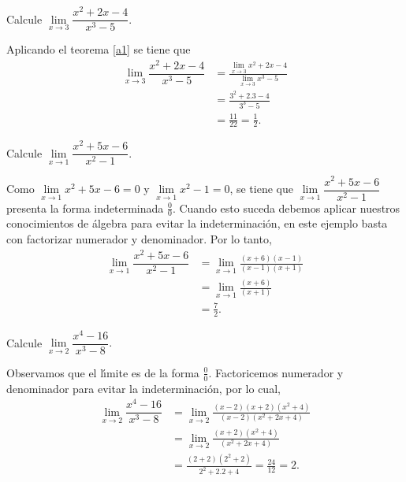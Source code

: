 \begin{example}
Calcule $\lim\limits_{x\rightarrow3}\dfrac{x^{2}+2x-4}{x^{3}-5}.$
\end{example}

\begin{sol}
Aplicando el teorema \ref{a1} se tiene que
\begin{align*}
\lim\limits_{x\rightarrow3}\dfrac{x^{2}+2x-4}{x^{3}-5}  &  =\frac
{\lim\limits_{x\rightarrow3}x^{2}+2x-4}{\lim\limits_{x\rightarrow3}x^{3}-5}\\
&  =\frac{3^{2}+2.3-4}{3^{3}-5}\\
&  =\frac{11}{22}=\frac{1}{2}.
\end{align*}

\end{sol}

\begin{example}
Calcule $\lim\limits_{x\rightarrow1}\dfrac{x^{2}+5x-6}{x^{2}-1}.$
\end{example}

\begin{sol}
Como $\lim\limits_{x\rightarrow1}x^{2}+5x-6=0$ y $\lim\limits_{x\rightarrow
1}x^{2}-1=0$, se tiene que $\lim\limits_{x\rightarrow1}\dfrac{x^{2}%
+5x-6}{x^{2}-1}$ presenta la forma indeterminada $\frac{0}{0}$. Cuando esto
suceda debemos aplicar nuestros conocimientos de \'{a}lgebra para evitar la
indeterminaci\'{o}n, en este ejemplo basta con factorizar numerador y
denominador. Por lo tanto,
\begin{align*}
\lim\limits_{x\rightarrow1}\dfrac{x^{2}+5x-6}{x^{2}-1}  &  =\lim
\limits_{x\rightarrow1}\frac{\left(  x+6\right)  \left(  x-1\right)  }{\left(
x-1\right)  \left(  x+1\right)  }\\
&  =\lim\limits_{x\rightarrow1}\frac{\left(  x+6\right)  }{\left(  x+1\right)
}\\
&  =\frac{7}{2}.
\end{align*}

\end{sol}

\begin{example}
Calcule $\lim\limits_{x\rightarrow2}\dfrac{x^{4}-16}{x^{3}-8}.$
\end{example}

\begin{sol}
Observamos que el l\'{\i}mite es de la forma $\frac{0}{0}.$ Factoricemos
numerador y denominador para evitar la indeterminaci\'{o}n, por lo cual,%
\begin{align*}
\lim\limits_{x\rightarrow2}\dfrac{x^{4}-16}{x^{3}-8}  &  =\lim
\limits_{x\rightarrow2}\frac{(x-2)(x+2)(x^{2}+4)}{(x-2)(x^{2}+2x+4)}\\
&  =\lim\limits_{x\rightarrow2}\frac{(x+2)(x^{2}+4)}{(x^{2}+2x+4)}\\
&  =\frac{(2+2)(2^{2}+2)}{2^{2}+2.2+4}=\frac{24}{12}=2.
\end{align*}

\end{sol}

